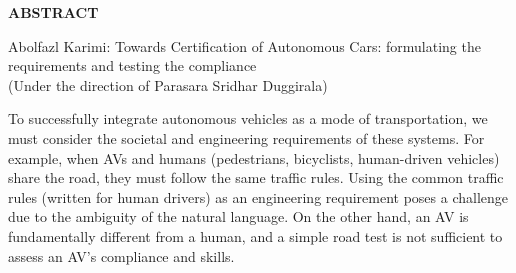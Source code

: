 
\begin{center}
\vspace*{52pt}
{\textbf{ABSTRACT}}
\vspace{11pt}

\begin{singlespace}
    Abolfazl Karimi: Towards Certification of Autonomous Cars: formulating the requirements and testing the compliance\\
(Under the direction of Parasara Sridhar Duggirala)
\end{singlespace}
\end{center}




To successfully integrate autonomous vehicles as a mode of transportation, we must consider the societal and engineering requirements of these systems.
%
For example, when AVs and humans (pedestrians, bicyclists, human-driven vehicles) share the road, they must follow the same traffic rules.
%
Using the common traffic rules (written for human drivers) as an engineering requirement poses a challenge due to the ambiguity of the natural language.
%
On the other hand, an AV is fundamentally different from a human, and a simple road test is not sufficient to assess an AV's compliance and skills.

